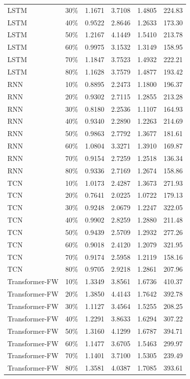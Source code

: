 \begin{longtable}{l c c c c c}
        LSTM & 30\% & 1.1671 & 3.7108 & 1.4805 & 224.83 \\
        LSTM & 40\% & 0.9522 & 2.8646 & 1.2633 & 173.30 \\
        LSTM & 50\% & 1.2167 & 4.1449 & 1.5410 & 213.78 \\
        LSTM & 60\% & 0.9975 & 3.1532 & 1.3149 & 158.95 \\
        LSTM & 70\% & 1.1847 & 3.7523 & 1.4932 & 222.21 \\
        LSTM & 80\% & 1.1628 & 3.7579 & 1.4877 & 193.42 \\
        RNN & 10\% & 0.8895 & 2.2473 & 1.1800 & 196.37 \\
        RNN & 20\% & 0.9302 & 2.7115 & 1.2855 & 213.28 \\
        RNN & 30\% & 0.8180 & 2.2536 & 1.1107 & 164.93 \\
        RNN & 40\% & 0.9340 & 2.2890 & 1.2263 & 214.69 \\
        RNN & 50\% & 0.9863 & 2.7792 & 1.3677 & 181.61 \\
        RNN & 60\% & 1.0804 & 3.3271 & 1.3910 & 169.87 \\
        RNN & 70\% & 0.9154 & 2.7259 & 1.2518 & 136.34 \\
        RNN & 80\% & 0.9336 & 2.7169 & 1.2674 & 158.86 \\
        TCN & 10\% & 1.0173 & 2.4287 & 1.3673 & 271.93 \\
        TCN & 20\% & 0.7641 & 2.0225 & 1.0722 & 179.13 \\
        TCN & 30\% & 0.9248 & 2.0679 & 1.2247 & 322.05 \\
        TCN & 40\% & 0.9902 & 2.8259 & 1.2880 & 211.48 \\
        TCN & 50\% & 0.9439 & 2.5709 & 1.2932 & 277.26 \\
        TCN & 60\% & 0.9018 & 2.4120 & 1.2079 & 321.95 \\
        TCN & 70\% & 0.9174 & 2.5958 & 1.2119 & 158.16 \\
        TCN & 80\% & 0.9705 & 2.9218 & 1.2861 & 207.96 \\
        Transformer-FW & 10\% & 1.3349 & 3.8561 & 1.6736 & 410.37 \\
        Transformer-FW & 20\% & 1.3850 & 4.4143 & 1.7642 & 392.78 \\
        Transformer-FW & 30\% & 1.1127 & 3.4564 & 1.5255 & 208.25 \\
        Transformer-FW & 40\% & 1.2291 & 3.8633 & 1.6294 & 307.22 \\
        Transformer-FW & 50\% & 1.3160 & 4.1299 & 1.6787 & 394.71 \\
        Transformer-FW & 60\% & 1.1477 & 3.6705 & 1.5463 & 299.97 \\
        Transformer-FW & 70\% & 1.1401 & 3.7100 & 1.5305 & 239.49 \\
        Transformer-FW & 80\% & 1.3581 & 4.0387 & 1.7085 & 393.61 \\

\end{longtable}
